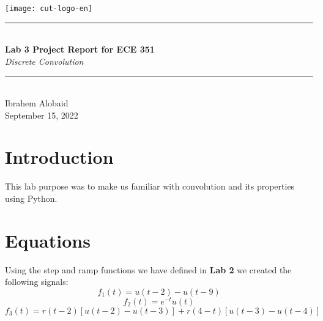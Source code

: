 \documentclass[12pt,a4paper]{article}
\newcommand{\HRule}{\rule{\linewidth}{0.5mm}}
\begin{document}
\begin{titlepage}
\begin{center}
\texttt{[image: cut-logo-en]}~\\[2cm]
\HRule \\[0.4cm]
{ \LARGE 
  \textbf{Lab 3 Project Report for ECE 351}\\[0.4cm]
  \emph{Discrete Convolution}\\[0.4cm]
}
\HRule \\[1.5cm]
{ \large
  Ibrahem Alobaid \\[0.1cm]
  September 15, 2022\\[0.1cm]
}
\vfill

\end{center}
\end{titlepage}
\newpage
\tableofcontents
{}
\newpage
\setcounter{page}{1}
\section{Introduction}\label{sec:intro}
This lab purpose was to make us familiar with convolution and its properties using Python.

\section{Equations}\label{sec:lit-rev}
Using the step and ramp functions we have defined in \textbf{Lab 2} we created the following signals:
\begin{equation}
    f_1(t) = u(t-2)-u(t-9)
\end{equation}
\begin{equation}
    f_2(t) = e^{-t}u(t)
\end{equation}
\begin{equation}
    f_3(t) = r(t-2)[u(t-2)-u(t-3)] + r(4-t)[u(t-3) - u(t-4)]
\end{equation}
\end{document}
